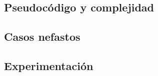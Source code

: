 \subsection{Pseudoc\'odigo y complejidad}


\subsection{Casos nefastos}


\subsection{Experimentaci\'on}




